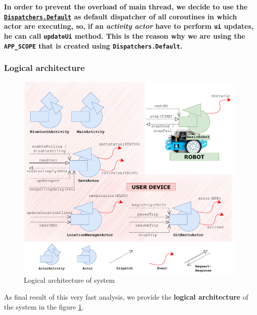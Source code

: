 \begin{tcolorbox}
	\begin{center}
		\textbf{In order to prevent the overload of main thread, we decide to use the \href{https://developer.android.com/kotlin/coroutines/coroutines-adv\#main-safety}{\texttt{Dispatchers.Default}} as default dispatcher of all coroutines in which actor are executing, so, if an \textit{activity actor} have to perform \texttt{ui} updates, he can call \texttt{updateUi} method.
			This is the reason why we are using the \texttt{APP\_SCOPE} that is created using \texttt{Dispatchers.Default}.
		}
	\end{center}
\end{tcolorbox}

\subsubsection{Logical architecture}

\begin{figure}[h!]
	\centering
	\includegraphics[width=\textwidth]{img/logical_architecture.pdf}
	\caption{Logical architecture of \gitberto system}
	\label{fig:logical_architecture}
\end{figure}

As final result of this very fast analysis, we provide the \textbf{logical architecture} of the \gitberto system in the figure \ref{fig:logical_architecture}.

